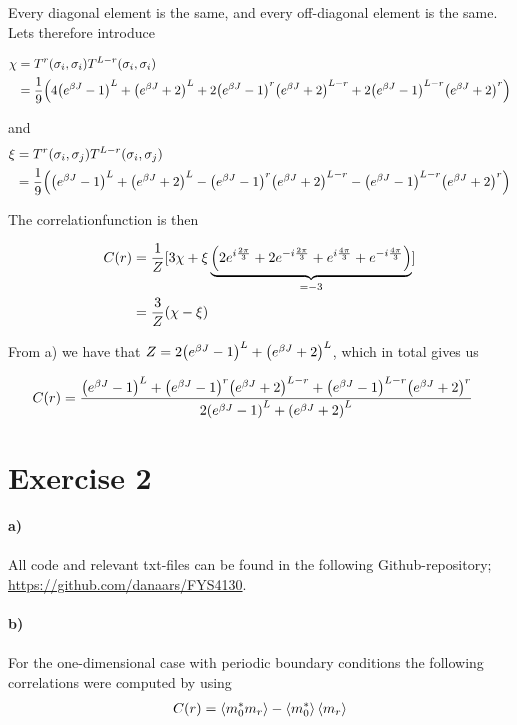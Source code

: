 \documentclass[12pt]{article}
\begin{document}
Every diagonal element is the same, and every off-diagonal element is the same.
Lets therefore introduce

\begin{align*}
    \chi &= T^r(\sigma_i, \sigma_i)T^{L-r}(\sigma_i,
    \sigma_i)\\ 
    &= \frac{1}{9}\qty(4\qty(e^{\beta J}-1)^L + \qty(e^{\beta J}+2)^L + 2\qty(e^{\beta
J}-1)^r\qty(e^{\beta J}+2)^{L-r} + 2\qty(e^{\beta J}-1)^{L-r}\qty(e^{\beta
J}+2)^r)
\end{align*}

and 
\begin{align*}
    \xi &= T^r(\sigma_i, \sigma_j)T^{L-r}(\sigma_i, \sigma_j)\\
    &=\frac{1}{9}\qty(\qty(e^{\beta J}-1)^L + \qty(e^{\beta J}+2)^L-
    \qty(e^{\beta J}-1)^r\qty(e^{\beta J}+2)^{L-r} - \qty(e^{\beta
    J}-1)^{L-r}\qty(e^{\beta J}+2)^r)
\end{align*}

The correlationfunction is then

\begin{align*}
    C(r) &= \frac{1}{Z}[3\chi + \xi\underbrace{\qty(2e^{i\frac{2\pi}{3}} + 2e^{-i\frac{2\pi}{3}} +
    e^{i\frac{4\pi}{3}} + e^{-i\frac{4\pi}{3}})}_{= -3}] \\
    &= \frac{3}{Z}\qty(\chi - \xi)
\end{align*}

From a) we have that $Z = 2\qty(e^{\beta J}-1)^L + \qty(e^{\beta J}+2)^L$, which
in total gives us

\begin{align*}
    C(r) &= \frac{\qty(e^{\beta J}-1)^L + \qty(e^{\beta J}-1)^r\qty(e^{\beta
    J}+2)^{L-r} + \qty(e^{\beta J}-1)^{L-r}\qty(e^{\beta J}+2)^r}{2\qty(e^{\beta J}-1)^L + \qty(e^{\beta J}+2)^L}
\end{align*}

\newpage
\section*{Exercise 2}

\textbf{a)} \\
\\
\noindent All code and relevant txt-files can be found in the following
Github-repository; \url{https://github.com/danaars/FYS4130}. \\
\\
\textbf{b)} \\
\\
For the one-dimensional case with periodic boundary conditions the following
correlations were computed by using
\begin{align*}
    C(r) = \expval{m_0^*m_r} - \expval{m_0^*}\expval{m_r}
\end{align*}
\end{document}
